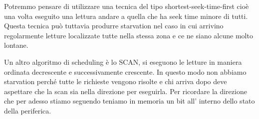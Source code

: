 Potremmo pensare di utilizzare una tecnica del tipo shortest-seek-time-first cioè una volta eseguito una lettura andare a quella che ha seek time minore di tutti.
Questa tecnica può tuttavia produrre starvation nel caso in cui arrivino regolarmente letture localizzate tutte nella stessa zona e ce ne siano alcune molto lontane.

Un altro algoritmo di scheduling è lo SCAN, si eseguono le letture in maniera ordinata decrescente e successivamente crescente.
In questo modo non abbiamo starvation perché tutte le richieste vengono risolte e chi arriva dopo deve aspettare che la scan sia nella direzione per eseguirla.
Per ricordare la direzione che per adesso stiamo seguendo teniamo in memoria un bit all' interno dello stato della periferica.





